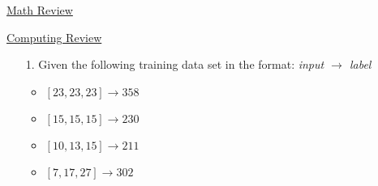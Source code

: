 \documentclass[main.tex]{subfiles}
\begin{document}
\href{https://www2.seas.gwu.edu/~simhaweb/quantum/modules/review/math-review/math-review.html}{Math Review}

\href{https://www2.seas.gwu.edu/~simhaweb/quantum/modules/review/comp-review/comp-review.html}{Computing Review}

\begin{enumerate}

\item[1.] Given the following training data set in the format: \textit{input $\rightarrow$ label}
\begin{itemize}[label={}]
    \item $[23,23,23] \rightarrow 358$
    \item $[15,15,15] \rightarrow 230$
    \item $[10,13,15] \rightarrow 211$
    \item $[7,17,27] \rightarrow 302$
\end{itemize}

\end{enumerate}
\end{document}
